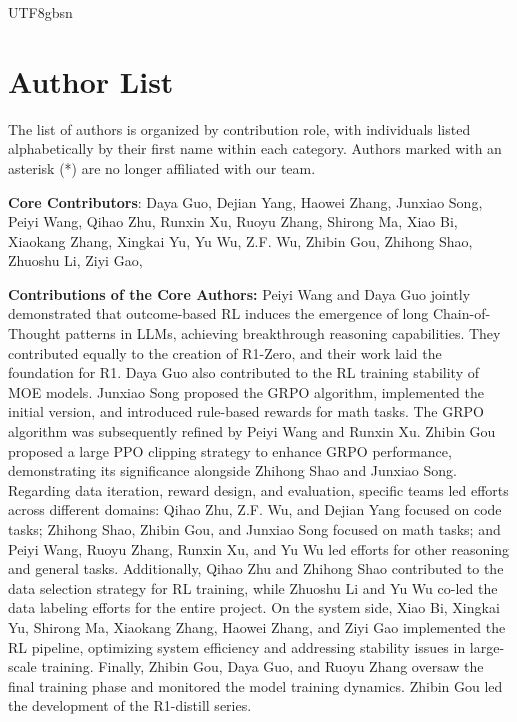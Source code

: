 \documentclass[11pt, a4paper, logo, copyright, nonumbering]{deepseek}
\begin{document}
\begin{CJK*}{UTF8}{gbsn}



\section{Author List}
The list of authors is organized by contribution role, with individuals listed alphabetically by their first name within each category. Authors marked with an asterisk (*) are no longer affiliated with our team.


\textbf{Core Contributors}:
Daya Guo,
Dejian Yang,
Haowei Zhang,
Junxiao Song,
Peiyi Wang,
Qihao Zhu,
Runxin Xu,
Ruoyu Zhang,
Shirong Ma,
Xiao Bi,
Xiaokang Zhang,
Xingkai Yu,
Yu Wu,
Z.F. Wu,
Zhibin Gou,
Zhihong Shao,
Zhuoshu Li,
Ziyi Gao,


\textbf{Contributions of the Core Authors: }
Peiyi Wang and Daya Guo jointly demonstrated that outcome-based RL induces the emergence of long Chain-of-Thought patterns in LLMs, achieving breakthrough reasoning capabilities. They contributed equally to the creation of R1-Zero, and their work laid the foundation for R1. Daya Guo also contributed to the RL training stability of MOE models. Junxiao Song proposed the GRPO algorithm, implemented the initial version, and introduced rule-based rewards for math tasks. The GRPO algorithm was subsequently refined by Peiyi Wang and Runxin Xu. Zhibin Gou proposed a large PPO clipping strategy to enhance GRPO performance,  demonstrating its significance alongside Zhihong Shao and Junxiao Song.
Regarding data iteration, reward design, and evaluation, specific teams led efforts across different domains: Qihao Zhu, Z.F. Wu, and Dejian Yang focused on code tasks; Zhihong Shao, Zhibin Gou, and Junxiao Song focused on math tasks; and Peiyi Wang, Ruoyu Zhang, Runxin Xu, and Yu Wu led efforts for other reasoning and general tasks. Additionally, Qihao Zhu and Zhihong Shao contributed to the data selection strategy for RL training, while Zhuoshu Li and Yu Wu co-led the data labeling efforts for the entire project.
On the system side, Xiao Bi, Xingkai Yu, Shirong Ma, Xiaokang Zhang, Haowei Zhang, and Ziyi Gao implemented the RL pipeline, optimizing system efficiency and addressing stability issues in large-scale training. Finally, Zhibin Gou, Daya Guo, and Ruoyu Zhang oversaw the final training phase and monitored the model training dynamics. Zhibin Gou led the development of the R1-distill series.



\end{CJK*}
\end{document}
